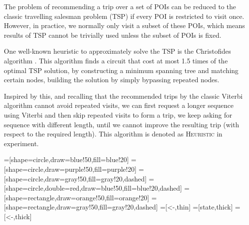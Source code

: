 

The problem of recommending a trip over a set of POIs can be reduced to the classic travelling salesman problem (TSP)
if every POI is restricted to visit once.
However, in practice, we normally only visit a subset of these POIs,
which means results of TSP cannot be trivially used unless the subset of POIs is fixed.


One well-known heuristic to approximately solve the TSP is the Christofides algorithm \citep{Christofides:1976}.
This algorithm finds a circuit that cost at most 1.5 times
of the optimal TSP solution, by constructing a minimum spanning tree and matching certain nodes, 
building the solution by simply bypassing repeated nodes.

Inspired by this, and recalling that the recommended trips by the classic Viterbi algorithm cannot avoid repeated visits,
we can first request a longer sequence using Viterbi and then skip repeated visits to form a trip, 
we keep asking for sequence with different length, until we cannot improve the resulting trip (with respect to the required length).
This algorithm is denoted as \textsc{Heuristic} in experiment.

=[shape=circle,draw=blue!50,fill=blue!20]
=[shape=circle,draw=purple!50,fill=purple!20]
=[shape=circle,draw=gray!50,fill=gray!20,dashed]
=[shape=circle,double=red,draw=blue!50,fill=blue!20,dashed]
=[shape=rectangle,draw=orange!50,fill=orange!20]
=[shape=rectangle,draw=gray!50,fill=gray!20,dashed]
=[<-,thin]
=[state,thick]
=[<-,thick]


